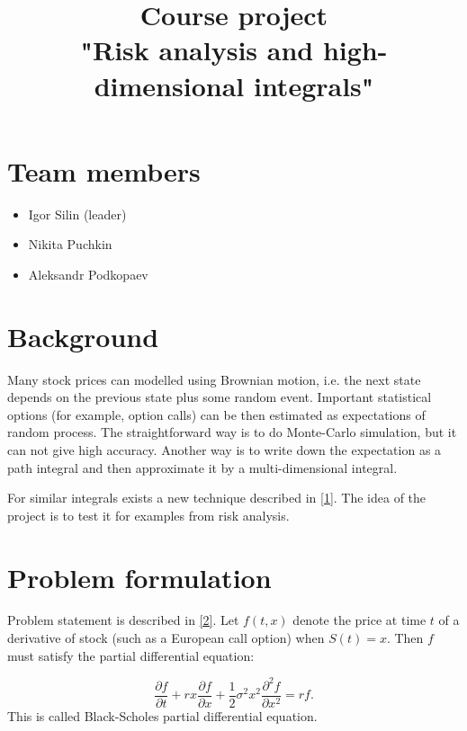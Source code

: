 \documentclass[11pt,a4paper]{extarticle}
\title{Course project \\
"Risk analysis and high-dimensional integrals"}
\author{}
\begin{document}
\maketitle

\section{Team members}

\begin{itemize}
    
    \item Igor Silin (leader)
    
    \item Nikita Puchkin
    
    \item Aleksandr Podkopaev
    
\end{itemize}

\section{Background}

Many stock prices can modelled using Brownian motion, i.e. the next state depends on the previous state plus some random event. Important statistical options (for example, option calls) can be then estimated as expectations of random process. The straightforward way is to do Monte-Carlo simulation, but it can not give high accuracy. Another way is to write down the expectation as a path integral and then approximate it by a multi-dimensional integral. 

For similar integrals exists a new technique described in \href{http://arxiv.org/abs/1504.06149}{[1]}. The idea of the project is to test it for examples from risk analysis.

\section{Problem formulation}

	Problem statement is described in  \href{http://www.columbia.edu/~ks20/FE-Notes/4700-07-Notes-GBM.pdf}{[2]}. Let $f(t, x)$ denote the price at time $t$ of a derivative of stock (such as a European call option) when $S(t) = x$. Then $f$ must satisfy the partial differential equation: 

\[
	\frac{\partial f}{\partial t} + rx \frac{\partial f}{\partial x} + \frac12 \sigma^2 x^2 \frac{\partial^2 f}{\partial x^2} = rf.
\]
This is called Black-Scholes partial differential equation.
\end{document}
